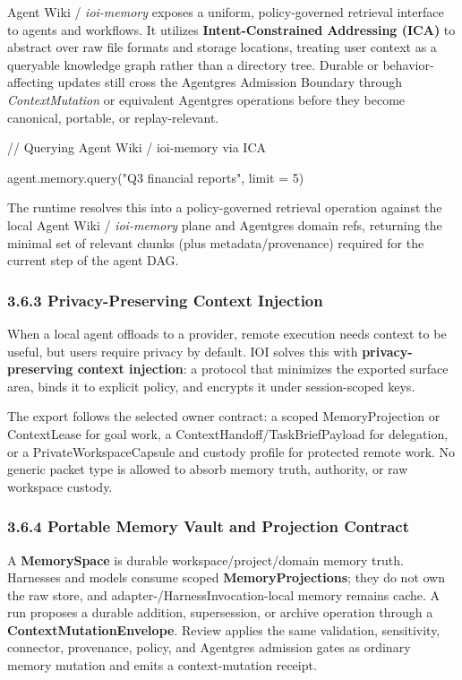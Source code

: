 \documentclass[
  11pt,
]{article}
\begin{document}
Agent Wiki / \emph{ioi-memory} exposes a uniform, policy-governed
retrieval interface to agents and workflows. It utilizes
\textbf{Intent-Constrained Addressing (ICA)} to abstract over raw file
formats and storage locations, treating user context as a queryable
knowledge graph rather than a directory tree. Durable or
behavior-affecting updates still cross the Agentgres Admission Boundary
through \emph{ContextMutation} or equivalent Agentgres operations before
they become canonical, portable, or replay-relevant.

// Querying Agent Wiki / ioi-memory via ICA

agent.memory.query("Q3 financial reports", limit = 5)

The runtime resolves this into a policy-governed retrieval operation
against the local Agent Wiki / \emph{ioi-memory} plane and Agentgres
domain refs, returning the minimal set of relevant chunks (plus
metadata/provenance) required for the current step of the agent DAG.

\hypertarget{privacy-preserving-context-injection}{%
\subsubsection{3.6.3 Privacy-Preserving Context
Injection}\label{privacy-preserving-context-injection}}

When a local agent offloads to a provider, remote execution needs
context to be useful, but users require privacy by default. IOI solves
this with \textbf{privacy-preserving context injection}: a protocol that
minimizes the exported surface area, binds it to explicit policy, and
encrypts it under session-scoped keys.

The export follows the selected owner contract: a scoped MemoryProjection or
ContextLease for goal work, a ContextHandoff/TaskBriefPayload for delegation,
or a PrivateWorkspaceCapsule and custody profile for protected remote work.
No generic packet type is allowed to absorb memory truth, authority, or raw
workspace custody.

\hypertarget{portable-memory-vault-and-projection-contract}{%
\subsubsection{3.6.4 Portable Memory Vault and Projection
Contract}\label{portable-memory-vault-and-projection-contract}}

A \textbf{MemorySpace} is durable workspace/project/domain memory truth.
Harnesses and models consume scoped \textbf{MemoryProjections}; they do not
own the raw store, and adapter-/HarnessInvocation-local memory remains cache. A run proposes a
durable addition, supersession, or archive operation through a
\textbf{ContextMutationEnvelope}. Review applies the same validation,
sensitivity, connector, provenance, policy, and Agentgres admission gates as
ordinary memory mutation and emits a context-mutation receipt.
\end{document}

